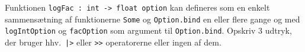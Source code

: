 Funktionen \lstinline{logFac : int -> float option} kan defineres som en enkelt sammensætning af funktionerne \lstinline{Some} og \lstinline{Option.bind} en eller flere gange og med \lstinline{logIntOption} og \lstinline{facOption} som argument til \lstinline{Option.bind}. Opskriv 3 udtryk, der bruger hhv.\ \lstinline{|>} eller \lstinline{>>} operatorerne eller ingen af dem.